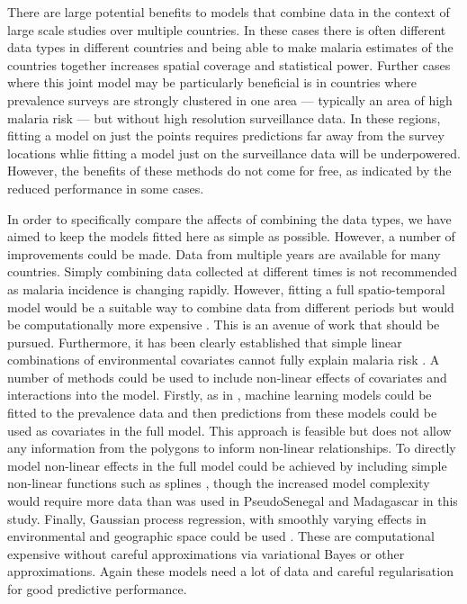 \documentclass[10pt,letterpaper]{article}
\begin{document}
There are large potential benefits to models that combine data in the context of large scale studies over multiple countries.
In these cases there is often different data types in different countries and being able to make malaria estimates of the countries together increases spatial coverage and statistical power.
Further cases where this joint model may be particularly beneficial is in countries where prevalence surveys are strongly clustered in one area --- typically an area of high malaria risk --- but without high resolution surveillance data. 
In these regions, fitting a model on just the points requires predictions far away from the survey locations whlie fitting a model just on the surveillance data will be underpowered. 
However, the benefits of these methods do not come for free, as indicated by the reduced performance in some cases.

In order to specifically compare the affects of combining the data types, we have aimed to keep the models fitted here as simple as possible.
However, a number of improvements could be made.
Data from multiple years are available for many countries.
Simply combining data collected at different times is not recommended as malaria incidence is changing rapidly.
However, fitting a full spatio-temporal model would be a suitable way to combine data from different periods but would be computationally more expensive \cite{bhatt2015effect, taylor2017continuous}.
This is an avenue of work that should be pursued.
Furthermore, it has been clearly established that simple linear combinations of environmental covariates cannot fully explain malaria risk \cite{bhatt2017improved}.
A number of methods could be used to include non-linear effects of covariates and interactions into the model.
Firstly, as in \cite{bhatt2017improved}, machine learning models could be fitted to the prevalence data and then predictions from these models could be used as covariates in the full model.
This approach is feasible but does not allow any information from the polygons to inform non-linear relationships.
To directly model non-linear effects in the full model could be achieved by including simple non-linear functions such as splines \cite{sissoko2017temporal, sewe2017using, hundessa2018projecting}, though the increased model complexity would require more data than was used in PseudoSenegal and Madagascar in this study.
Finally, Gaussian process regression, with smoothly varying effects in environmental and geographic space could be used \cite{law2018variational}.
These are computational expensive without careful approximations via variational Bayes or other approximations.
Again these models need a lot of data and careful regularisation for good predictive performance.
\end{document}
